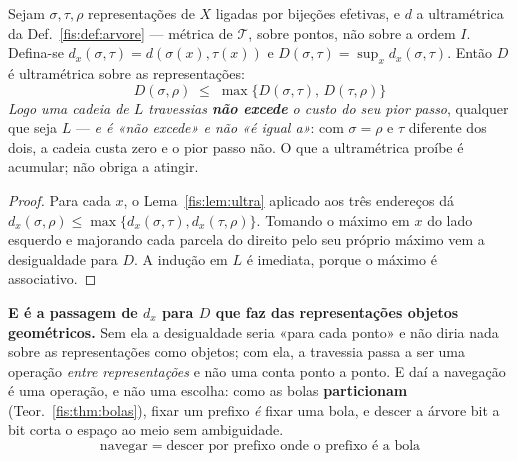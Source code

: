 \documentclass[livro.tex]{subfiles}
\begin{document}
\begin{teorema}\label{fis:thm:navega}
Sejam $\sigma,\tau,\rho$ representações de $X$ ligadas por bijeções efetivas, e
$d$ a ultramétrica da Def.~\ref{fis:def:arvore} --- métrica de $\mathcal{T}$,
sobre pontos, não sobre a ordem $I$. Defina-se
$d_x(\sigma,\tau)=d(\sigma(x),\tau(x))$ e
$D(\sigma,\tau)=\sup_{x} d_x(\sigma,\tau)$. Então $D$ é ultramétrica sobre as
representações:
\[
\boxed{\;D(\sigma,\rho)\;\le\;\max\bigl\{D(\sigma,\tau),\,D(\tau,\rho)\bigr\}\;}
\]
\emph{Logo uma cadeia de $L$ travessias \textbf{não excede} o custo do seu pior
passo}, qualquer que seja $L$ --- \emph{e é «não excede» e não «é igual a»}: com
$\sigma=\rho$ e $\tau$ diferente dos dois, a cadeia custa zero e o pior passo não.
O que a ultramétrica proíbe é acumular; não obriga a atingir.
\end{teorema}

\begin{proof}
Para cada $x$, o Lema~\ref{fis:lem:ultra} aplicado aos três endereços dá
$d_x(\sigma,\rho)\le\max\{d_x(\sigma,\tau),d_x(\tau,\rho)\}$. Tomando o máximo em
$x$ do lado esquerdo e majorando cada parcela do direito pelo seu próprio máximo
vem a desigualdade para $D$. A indução em $L$ é imediata, porque o máximo é
associativo.
\end{proof}

\medskip\noindent\textbf{E é a passagem de $d_x$ para $D$ que faz das
representações objetos geométricos.} Sem ela a desigualdade seria «para cada
ponto» e não diria nada sobre as representações como objetos; com ela, a
travessia passa a ser uma operação \emph{entre representações} e não uma conta
ponto a ponto. E daí a navegação é uma operação, e não uma escolha: como as bolas
\textbf{particionam} (Teor.~\ref{fis:thm:bolas}), fixar um prefixo \emph{é} fixar
uma bola, e descer a árvore bit a bit corta o espaço ao meio sem ambiguidade.
\[
\boxed{\;\text{navegar} \;=\; \text{descer por prefixo onde o prefixo é a bola}\;}
\]
\end{document}
